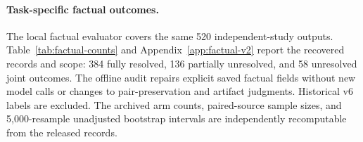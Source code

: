 \paragraph{Task-specific factual outcomes.}
The local factual evaluator covers the same 520 independent-study outputs. Table~\ref{tab:factual-counts} and Appendix~\ref{app:factual-v2} report the recovered records and scope: 384 fully resolved, 136 partially unresolved, and 58 unresolved joint outcomes. The offline audit repairs explicit saved factual fields without new model calls or changes to pair-preservation and artifact judgments. Historical v6 labels are excluded. The archived arm counts, paired-source sample sizes, and 5,000-resample unadjusted bootstrap intervals are independently recomputable from the released records.
